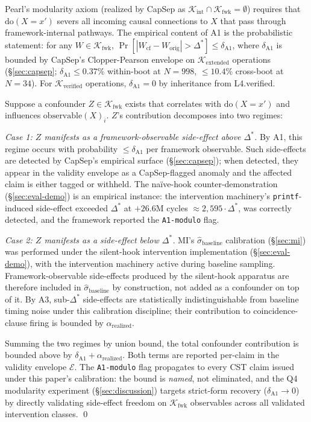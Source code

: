 \documentclass[conference]{IEEEtran}
\newcommand{\Kverified}{\mathcal{K}_\text{verified}}
\newcommand{\Kextended}{\mathcal{K}_\text{extended}}
\newcommand{\Kint}{\mathcal{K}_\text{int}}
\newcommand{\Kfwk}{\mathcal{K}_\text{fwk}}
\newcommand{\sigbase}{\hat{\sigma}_\text{baseline}}
\newcommand{\Dstar}{\Delta^{*}}
\newcommand{\arealized}{\alpha_\text{realized}}
\newcommand{\dox}[1]{\text{do}(X{=}#1)}
\begin{document}
Pearl's modularity axiom (realized by CapSep as
$\Kint \cap \Kfwk = \emptyset$) requires that $\dox{x'}$ severs
all incoming causal connections to $X$ that pass through
framework-internal pathways. The empirical content of A1 is the
probabilistic statement: for any $W \in \Kfwk$,
$\Pr[|W_{\text{cf}} - W_{\text{orig}}| > \Dstar] \leq
\delta_{\text{A1}}$, where $\delta_{\text{A1}}$ is bounded by
CapSep's Clopper-Pearson envelope on $\Kextended$ operations
(\S\ref{sec:capsep}; $\delta_{\text{A1}} \leq 0.37\%$ within-boot
at $N{=}998$, $\leq 10.4\%$ cross-boot at $N{=}34$). For
$\Kverified$ operations, $\delta_{\text{A1}} = 0$ by inheritance
from L4.verified.

Suppose a confounder $Z \in \Kfwk$ exists that correlates with
$\dox{x'}$ and influences $\text{observable}(X)_i$. $Z$'s
contribution decomposes into two regimes:

\emph{Case 1: $Z$ manifests as a framework-observable side-effect
above $\Dstar$.} By A1, this regime occurs with probability
$\leq \delta_{\text{A1}}$ per framework observable. Such
side-effects are detected by CapSep's empirical surface
(\S\ref{sec:capsep}); when detected, they appear in the validity
envelope as a CapSep-flagged anomaly and the affected claim is
either tagged or withheld. The naïve-hook counter-demonstration
(\S\ref{sec:eval-demo}) is an empirical instance: the intervention
machinery's \texttt{printf}-induced side-effect exceeded $\Dstar$
at $+26.6$M cycles $\approx 2{,}595 \cdot \Dstar$, was correctly
detected, and the framework reported the \texttt{A1-modulo} flag.

\emph{Case 2: $Z$ manifests as a side-effect below $\Dstar$.}
MI's $\sigbase$ calibration (\S\ref{sec:mi}) was performed under
the silent-hook intervention implementation (\S\ref{sec:eval-demo}),
with the intervention machinery active during baseline sampling.
Framework-observable side-effects produced by the silent-hook
apparatus are therefore included in $\sigbase$ by construction,
not added as a confounder on top of it. By A3, sub-$\Dstar$
side-effects are statistically indistinguishable from baseline
timing noise under this calibration discipline; their contribution
to coincidence-clause firing is bounded by $\arealized$.

Summing the two regimes by union bound, the total confounder
contribution is bounded above by
$\delta_{\text{A1}} + \arealized$. Both terms are reported
per-claim in the validity envelope $\mathcal{E}$. The
\texttt{A1-modulo} flag propagates to every CST claim issued under
this paper's calibration: the bound is \emph{named}, not
eliminated, and the Q4 modularity experiment
(\S\ref{sec:discussion}) targets strict-form recovery
($\delta_{\text{A1}} \to 0$) by directly validating side-effect
freedom on $\Kfwk$ observables across all validated intervention
classes. \qed
\end{document}
